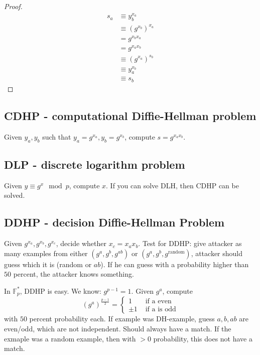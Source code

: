 \documentclass[language=english,number=]{homework}
\begin{document}
\begin{proof}
    \begin{align*}
        s_a &\equiv y_b^{x_a} \\
        &\equiv (g^{x_b})^{x_a} \\
        &= g^{x_b x_a} \\
        &= g^{x_a x_b} \\
        & \equiv (g^{x_a})^{s_b} \\
        &\equiv y_a^{x_b} \\
        &\equiv s_b
    \end{align*}
\end{proof}

    \subsection{CDHP - computational Diffie-Hellman problem}

    Given $y_a, y_b$ such that $y_a = g^{x_a}, y_b = g^{x_b}$, compute $s = g^{x_a x_b}$.

    \subsection{DLP - discrete logarithm problem}

    Given $y \equiv g^x \mod p$, compute $x$.
    If you can solve DLH, then CDHP can be solved.

    \subsection{DDHP - decision Diffie-Hellman Problem}

    Given $g^{x_a}, g^{x_b}, g^{x_c}$, decide whether $x_c = x_a x_b$.
    Test for DDHP: give attacker as many examples from either $(g^a,g^b,g^{ab})$ or $(g^a, g^b, g^{\text{random}})$, attacker should guess which it is (random or $ab$).
    If he can guess with a probability higher than $50$ percent, the attacker knows something.

    In $\mathbb{F}_p^*$, DDHP is easy.
    We know: $g^{p-1} = 1$.
    Given $g^a$, compute
\[
(g^a)^{\frac{p-1}{2}} = \begin{cases}
                            1 &\text{ if a even }  \\
                            \pm 1 &\text{ if a is odd}
\end{cases}
\]
    with $50$ percent probability each.
    If example was DH-example, guess $a,b,ab$ are even/odd, which are not independent.
    Should always have a match.
    If the exmaple was a random example, then with $>0$ probability, this does not have a match.
\end{document}
